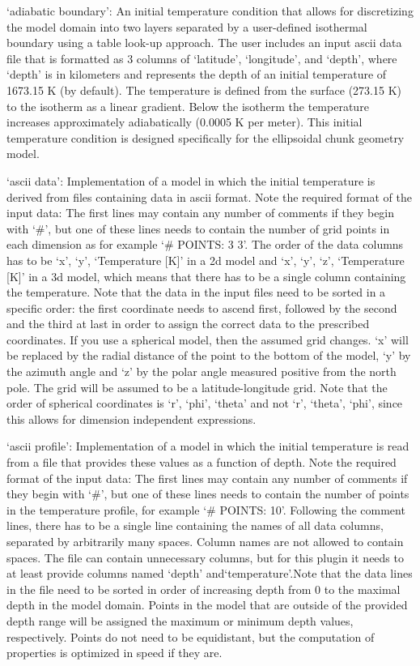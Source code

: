 \begin{itemize}
`adiabatic boundary': An initial temperature condition that allows for discretizing the model domain into two layers separated by a user-defined isothermal boundary using a table look-up approach. The user includes an input ascii data file that is formatted as 3 columns of `latitude', `longitude', and `depth', where `depth' is in kilometers and represents the depth of an initial temperature of 1673.15 K (by default). The temperature is defined from the surface (273.15 K) to the isotherm as a linear gradient. Below the isotherm the temperature increases approximately adiabatically (0.0005 K per meter). This initial temperature condition is designed specifically for the ellipsoidal chunk geometry model.

`ascii data': Implementation of a model in which the initial temperature is derived from files containing data in ascii format. Note the required format of the input data: The first lines may contain any number of comments if they begin with `\#', but one of these lines needs to contain the number of grid points in each dimension as for example `\# POINTS: 3 3'. The order of the data columns has to be `x', `y', `Temperature [K]' in a 2d model and  `x', `y', `z', `Temperature [K]' in a 3d model, which means that there has to be a single column containing the temperature. Note that the data in the input files need to be sorted in a specific order: the first coordinate needs to ascend first, followed by the second and the third at last in order to assign the correct data to the prescribed coordinates. If you use a spherical model, then the assumed grid changes. `x' will be replaced by the radial distance of the point to the bottom of the model, `y' by the azimuth angle and `z' by the polar angle measured positive from the north pole. The grid will be assumed to be a latitude-longitude grid. Note that the order of spherical coordinates is `r', `phi', `theta' and not `r', `theta', `phi', since this allows for dimension independent expressions.

`ascii profile': Implementation of a model in which the initial temperature is read from a file that provides these values as a function of depth. Note the required format of the input data: The first lines may contain any number of comments if they begin with `\#', but one of these lines needs to contain the number of points in the temperature profile, for example `\# POINTS: 10'. Following the comment lines, there has to be a single line containing the names of all data columns, separated by arbitrarily many spaces. Column names are not allowed to contain spaces. The file can contain unnecessary columns, but for this plugin it needs to at least provide columns named `depth' and`temperature'.Note that the data lines in the file need to be sorted in order of increasing depth from 0 to the maximal depth in the model domain. Points in the model that are outside of the provided depth range will be assigned the maximum or minimum depth values, respectively. Points do not need to be equidistant, but the computation of properties is optimized in speed if they are.


\end{itemize}

